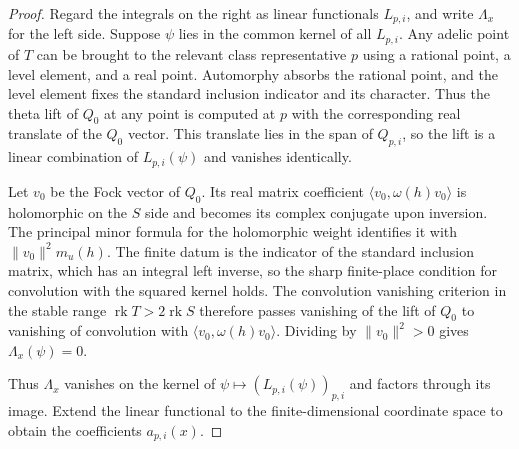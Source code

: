 \begin{proof}
Regard the integrals on the right as linear functionals $L_{p,i}$, and write $\Lambda_x$ for the left side. Suppose $\psi$ lies in the common kernel of all $L_{p,i}$. Any adelic point of $T$ can be brought to the relevant class representative $p$ using a rational point, a level element, and a real point. Automorphy absorbs the rational point, and the level element fixes the standard inclusion indicator and its character. Thus the theta lift of $Q_0$ at any point is computed at $p$ with the corresponding real translate of the $Q_0$ vector. This translate lies in the span of $Q_{p,i}$, so the lift is a linear combination of $L_{p,i}(\psi)$ and vanishes identically.

Let $v_0$ be the Fock vector of $Q_0$. Its real matrix coefficient $\langle v_0,\omega(h)v_0\rangle$ is holomorphic on the $S$ side and becomes its complex conjugate upon inversion. The principal minor formula for the holomorphic weight identifies it with $\|v_0\|^2 m_u(h)$. The finite datum is the indicator of the standard inclusion matrix, which has an integral left inverse, so the sharp finite-place condition for convolution with the squared kernel holds. The convolution vanishing criterion in the stable range $\operatorname{rk}T>2\operatorname{rk}S$ therefore passes vanishing of the lift of $Q_0$ to vanishing of convolution with $\langle v_0,\omega(h)v_0\rangle$. Dividing by $\|v_0\|^2>0$ gives $\Lambda_x(\psi)=0$.

Thus $\Lambda_x$ vanishes on the kernel of $\psi\mapsto(L_{p,i}(\psi))_{p,i}$ and factors through its image. Extend the linear functional to the finite-dimensional coordinate space to obtain the coefficients $a_{p,i}(x)$.
\end{proof}

